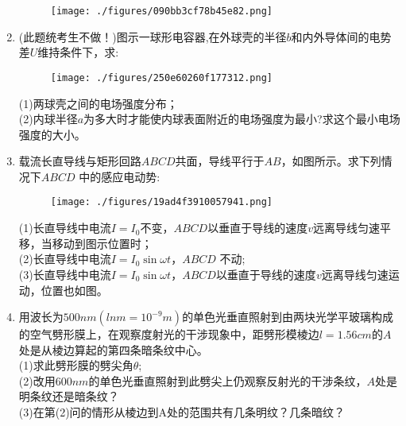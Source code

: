 \begin{enumerate}
\begin{figure}[ht]
\centering
\texttt{[image: ./figures/090bb3cf78b45e82.png]}
\caption{} \label{fig_BKDP06_4}
\end{figure}
\item (此题统考生不做！)图示一球形电容器,在外球壳的半径$b$和内外导体间的电势差$U$维持条件下，求:\\
\begin{figure}[ht]
\centering
\texttt{[image: ./figures/250e60260f177312.png]}
\caption{} \label{fig_BKDP06_3}
\end{figure}
(1)两球壳之间的电场强度分布；\\
(2)内球半径$a$为多大时才能使内球表面附近的电场强度为最小?求这个最小电场强度的大小。
\item 载流长直导线与矩形回路$ABCD$共面，导线平行于$ AB$，如图所示。求下列情况下$ABCD$ 中的感应电动势:\\
\begin{figure}[ht]
\centering
\texttt{[image: ./figures/19ad4f3910057941.png]}
\caption{} \label{fig_BKDP06_2}
\end{figure}
(1)长直导线中电流$I=I_0$不变，$ABCD $以垂直于导线的速度$v$远离导线匀速平移，当移动到图示位置时；\\
(2)长直导线中电流$I=I_0\sin \omega t$，$ABCD$ 不动;\\
(3)长直导线中电流$I=I_0\sin \omega t$，$ABCD$以垂直于导线的速度$v$远离导线匀速运动，位置也如图。
\item 用波长为$ 500nm(lnm=10^{-9}m)$的单色光垂直照射到由两块光学平玻璃构成的空气劈形膜上，在观察度射光的干涉现象中，距劈形模棱边$l=1.56cm$的$A$处是从棱边算起的第四条暗条纹中心。\\
(1)求此劈形膜的劈尖角$\theta$;\\
(2)改用$600nm$的单色光垂直照射到此劈尖上仍观察反射光的干涉条纹，$A$处是明条纹还是暗条纹？\\(3)在第(2)问的情形从棱边到A处的范围共有几条明纹？几条暗纹？
\end{enumerate}